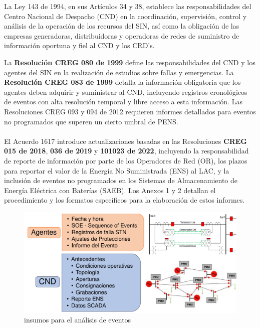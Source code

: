 \documentclass[a5paper]{book}%
\begin{document}
\begin{center}
\begin{tcolorbox}
La Ley 143 de 1994, en sus Artículos 34 y 38, establece las responsabilidades del Centro Nacional de Despacho (CND) en la coordinación, supervisión, control y análisis de la operación de los recursos del SIN, así como la obligación de las empresas generadoras, distribuidoras y operadoras de redes de suministro de información oportuna y fiel al CND y los CRD's.
\end{tcolorbox}
\end{center}

La \textbf{Resolución CREG 080 de 1999} define las responsabilidades del CND y los agentes del SIN en la realización de estudios sobre fallas y emergencias. La \textbf{Resolución CREG 083 de 1999} detalla la información obligatoria que los agentes deben adquirir y suministrar al CND, incluyendo registros cronológicos de eventos con alta resolución temporal y libre acceso a esta información. Las Resoluciones CREG 093 y 094 de 2012 requieren informes detallados para eventos no programados que superen un cierto umbral de PENS.\\\\

El Acuerdo 1617 introduce actualizaciones basadas en las Resoluciones \textbf{CREG 015 de 2018}, \textbf{036 de 2019} y \textbf{101023 de 2022}, incluyendo la responsabilidad de reporte de información por parte de los Operadores de Red (OR), los plazos para reportar el valor de la Energía No Suministrada (ENS) al LAC, y la inclusión de eventos no programados en los Sistemas de Almacenamiento de Energía Eléctrica con Baterías (SAEB). Los Anexos 1 y 2 detallan el procedimiento y los formatos específicos para la elaboración de estos informes.

\begin{figure}[H]
  \centering
  
  \caption{insumos para el análisis de eventos}
  \label{fig:insumoseventos}
  \includegraphics[width=0.8\linewidth]{insumos_eventos}
\end{figure}
\end{document}
